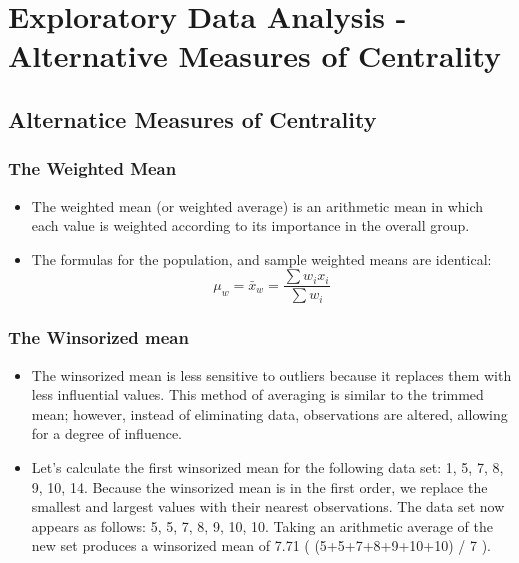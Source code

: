 \documentclass[]{report}
\begin{document}
	
\chapter{Exploratory Data Analysis - Alternative Measures of Centrality}
	
\tableofcontents	

\section{Alternatice Measures of Centrality}
\subsection{The Weighted Mean}
	
	
	\begin{itemize}
		\item  The weighted mean (or weighted average) is an arithmetic mean in which each value is weighted according
		to its importance in the overall group. 
		\vspace{0.4cm}
		\item The formulas for the population, and sample weighted means are
		identical:
		\[ \mu_w = \bar{x}_w =\frac{\sum w_i x_i}{\sum w_i} \]
	\end{itemize}

	\subsection{The Winsorized mean}
\begin{itemize}
	\item The winsorized mean is less sensitive to outliers because it replaces them with less influential values. This method of averaging is similar to the trimmed mean; however, instead of eliminating data, observations are altered, allowing for a degree of influence.
	
\item Let's calculate the first winsorized mean for the following data set: 1, 5, 7, 8, 9, 10, 14. Because the winsorized mean is in the first order, we replace the smallest and largest values with their nearest observations. The data set now appears as follows: 5, 5, 7, 8, 9, 10, 10. Taking an arithmetic average of the new set produces a winsorized mean of 7.71 ( (5+5+7+8+9+10+10) / 7 ).
\end{itemize}
\end{document}
